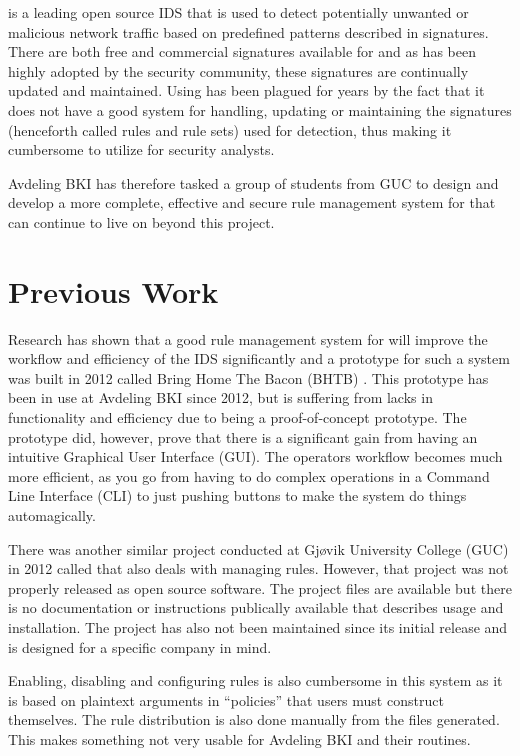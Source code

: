 \snort{} is a leading open source IDS that is used to detect potentially unwanted
or malicious network traffic based on predefined patterns described in signatures. There are both
free and commercial signatures available for \snort{} and as \snort{} has been highly
adopted by the security community, these signatures are continually updated and maintained.
Using \snort{} has been plagued for years by the fact that it does not have a good
system for handling, updating or maintaining the signatures (henceforth called rules and rule sets) used
for detection, thus making it cumbersome to utilize \snort{} for security analysts.

Avdeling BKI has therefore tasked a group of students from GUC to design and develop a
more complete, effective and secure rule management system for \snort{} that can
continue to live on beyond this project.

\section{Previous Work}
Research \cite{BHTB} has shown that a good rule management system for \snort{}
will improve the workflow and efficiency of the IDS significantly and a prototype for such a system was built
in 2012 called Bring Home The Bacon (BHTB) \cite{BHTB}. This prototype has been
in use at Avdeling BKI since 2012, but is suffering from lacks in functionality
and efficiency due to being a proof-of-concept prototype. The prototype did,
however, prove that there is a significant gain from having an intuitive
Graphical User Interface (GUI). The operators workflow becomes much more
efficient, as you go from having to do complex operations in a Command Line
Interface (CLI) to just pushing buttons to make the system do
things automagically.

There was another similar project conducted at Gjøvik University College (GUC)
in 2012 called \snortmanager{} \cite{SnortManager} that also deals with
managing \snort{} rules.
However, that project was not properly released as open source software. The
project files are available but there is no documentation or instructions
publically available that describes usage and installation. The project has
also not been maintained since its initial release and is designed for a
specific company in mind.

Enabling, disabling and
configuring rules is also cumbersome in this system as it is based on plaintext
arguments in ``policies'' that users must construct themselves. The rule distribution is also done manually
from the files generated. This makes \snortmanager{} something not very usable
for Avdeling BKI and their routines.

